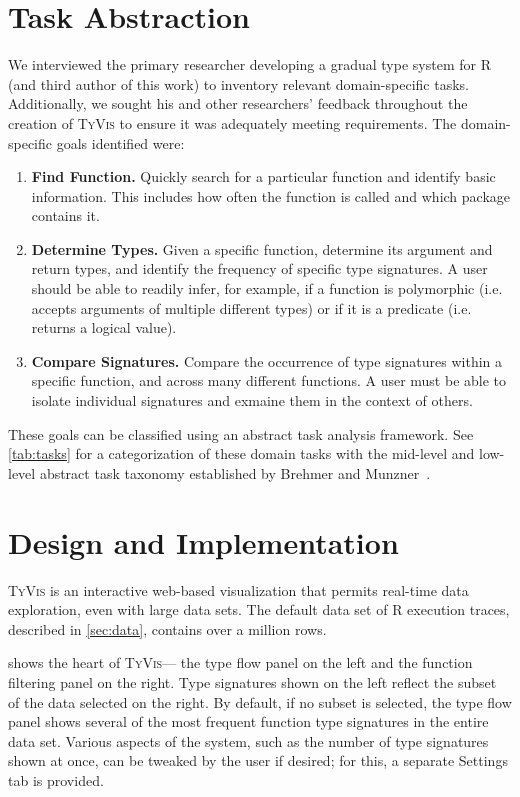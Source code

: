 \documentclass{vgtc}                          %
\newcommand{\ourmethodplaintext}{\textsc{TyVis}\xspace}
\newcommand{\ourmethod}{{\sc \ourmethodplaintext}\xspace}
\newcommand{\settingsTab}{{\sc Settings}\xspace}
\begin{document}
\section{Task Abstraction}

We interviewed the primary researcher developing a gradual type system for R (and third author of this work) to inventory relevant domain-specific tasks.
Additionally, we sought his and other researchers' feedback throughout the creation of \ourmethod to ensure it was adequately meeting requirements.
The domain-specific goals identified were:

\begin{enumerate}
\item {\bf Find Function.}
  Quickly search for a particular function and identify basic information.
  This includes how often the function is called and which package contains it.
\item {\bf Determine Types.}
  Given a specific function, determine its argument and return types, and identify the frequency of specific type signatures.
  A user should be able to readily infer, for example, if a function is polymorphic (i.e. accepts arguments of multiple different types) or if it is a predicate (i.e. returns a logical value).
\item {\bf Compare Signatures.}
  Compare the occurrence of type signatures within a specific function, and across many different functions.
  A user must be able to isolate individual signatures and exmaine them in the context of others.
\end{enumerate}

These goals can be classified using an abstract task analysis framework.
See \cref{tab:tasks} for a categorization of these domain tasks with the mid-level and low-level abstract task taxonomy established by Brehmer and Munzner~\cite{brehmer:2013}.


\section{Design and Implementation}

\ourmethod is an interactive web-based visualization that permits real-time data exploration, even with large data sets.
The default data set of R execution traces, described in \cref{sec:data}, contains over a million rows.

 shows the heart of \ourmethod --- the type flow panel on the left and the function filtering panel on the right.
Type signatures shown on the left reflect the subset of the data selected on the right.
By default, if no subset is selected, the type flow panel shows several of the most frequent function type signatures in the entire data set.
Various aspects of the system, such as the number of type signatures shown at once, can be tweaked by the user if desired; for this, a separate \settingsTab tab is provided.
\end{document}
